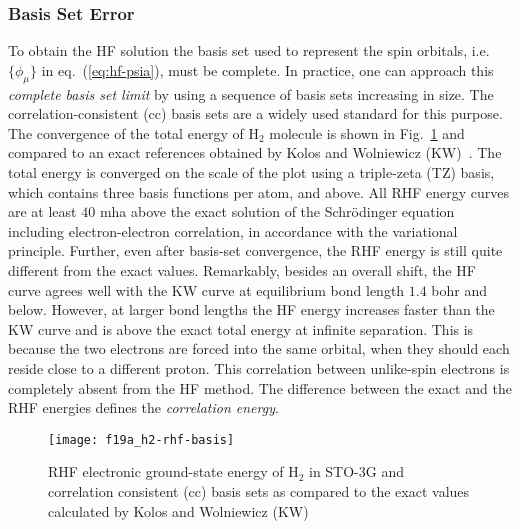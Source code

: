 \subsubsection{Basis Set Error}

To obtain the HF solution the basis set used to represent the spin orbitals, i.e. $\{\phi_\mu\}$ in eq.~(\ref{eq:hf-psia}), must be complete.
In practice, one can approach this \textit{complete basis set limit} by using a sequence of basis sets increasing in size.
The correlation-consistent (cc) basis sets are a widely used standard for this purpose.
The convergence of the total energy of H$_2$ molecule is shown in Fig.~\ref{fig:hf-h2} and compared to an exact references obtained by Kolos and Wolniewicz (KW)~\cite{Kolos1964}.
The total energy is converged on the scale of the plot using a triple-zeta (TZ) basis, which contains three basis functions per atom, and above.
All RHF energy curves are at least $40$ mha above the exact solution of the Schr\"odinger equation including electron-electron correlation, in accordance with the variational principle.
Further, even after basis-set convergence, the RHF energy is still quite different from the exact values.
Remarkably, besides an overall shift, the HF curve agrees well with the KW curve at equilibrium bond length $1.4$ bohr and below.
However, at larger bond lengths the HF energy increases faster than the KW curve and is above the exact total energy at infinite separation.
This is because the two electrons are forced into the same orbital, when they should each reside close to a different proton.
This correlation between unlike-spin electrons is completely absent from the HF method.
The difference between the exact and the RHF energies defines the \textit{correlation energy}.

\begin{figure}[h]
\centering
\texttt{[image: f19a\_h2-rhf-basis]}
\caption{RHF electronic ground-state energy of H$_2$ in STO-3G and correlation consistent (cc) basis sets as compared to the exact values calculated by Kolos and Wolniewicz (KW)~\cite{Kolos1964}}
\label{fig:hf-h2}
\end{figure}

